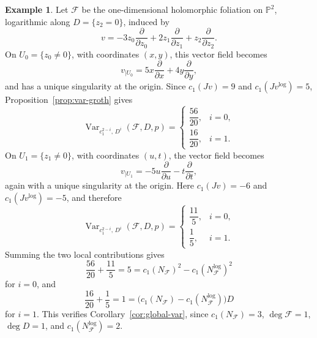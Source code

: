 \documentclass[12pt,reqno,a4paper]{amsart}
\numberwithin{equation}{section}
\theoremstyle{plain}
\theoremstyle{definition}
\newtheorem{example}[example]{Example}
\DeclareMathOperator{\Var}{Var}
\newcommand{\cF}{\mathcal{F}}
\begin{document}
 
\begin{example}
Let \(\cF\) be the one-dimensional holomorphic foliation on \(\mathbb P^2\),
logarithmic along \(D=\{z_2=0\}\), induced by
\[
v
=
-3z_0\frac{\partial}{\partial z_0}
+
2z_1\frac{\partial}{\partial z_1}
+
z_2\frac{\partial}{\partial z_2}.
\]
On \(U_0=\{z_0\neq 0\}\), with coordinates \((x,y)\), this vector field becomes
\[
v_{|U_0}
=
5x\frac{\partial}{\partial x}
+
4y\frac{\partial}{\partial y},
\]
and has a unique singularity at the origin. Since \(c_1(Jv)=9\) and
\(c_1(Jv^{\log})=5\), Proposition~\ref{prop:var-groth} gives
\[
\Var_{c_1^{2-i},\,D^i}(\cF,D,p)
=
\begin{cases}
\dfrac{56}{20}, & i=0,\\[6pt]
\dfrac{16}{20}, & i=1.
\end{cases}
\]
On \(U_1=\{z_1\neq 0\}\), with coordinates \((u,t)\), the vector field becomes
\[
v_{|U_1}
=
-5u\frac{\partial}{\partial u}
-
t\frac{\partial}{\partial t},
\]
again with a unique singularity at the origin. Here \(c_1(Jv)=-6\) and
\(c_1(Jv^{\log})=-5\), and therefore
\[
\Var_{c_1^{2-i},\,D^i}(\cF,D,p)
=
\begin{cases}
\dfrac{11}{5}, & i=0,\\[6pt]
\dfrac{1}{5}, & i=1.
\end{cases}
\]
Summing the two local contributions gives
\[
\frac{56}{20}+\frac{11}{5}=5
=
c_1(N_{\cF})^2-c_1(N_{\cF}^{\log})^2
\]
for \(i=0\), and
\[
\frac{16}{20}+\frac{1}{5}=1
=
\bigl(c_1(N_{\cF})-c_1(N_{\cF}^{\log})\bigr)D
\]
for \(i=1\). This verifies Corollary~\ref{cor:global-var}, since
\(c_1(N_{\cF})=3\), \(\deg\cF=1\), \(\deg D=1\), and
\(c_1(N_{\cF}^{\log})=2\).
\end{example}
\end{document}
